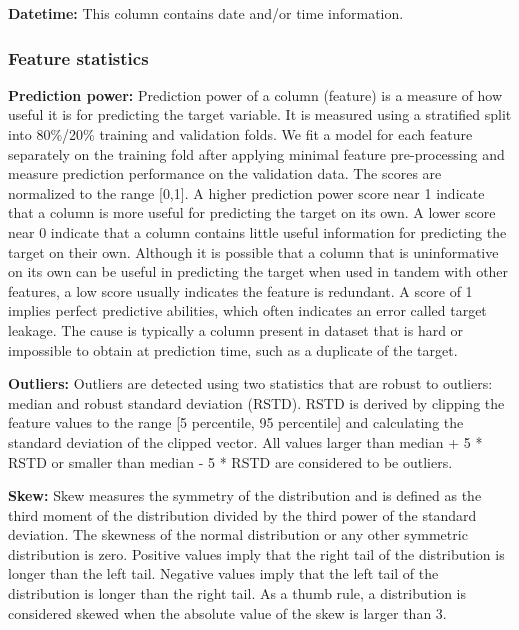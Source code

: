 \documentclass[11pt]{article}
\begin{document}
\textbf{Datetime:} This column contains date and/or time information.

\hypertarget{feature-statistics}{%
\subsubsection{Feature statistics}\label{feature-statistics}}

\textbf{Prediction power:} Prediction power of a column (feature) is a
measure of how useful it is for predicting the target variable. It is
measured using a stratified split into 80\%/20\% training and validation
folds. We fit a model for each feature separately on the training fold
after applying minimal feature pre-processing and measure prediction
performance on the validation data. The scores are normalized to the
range {[}0,1{]}. A higher prediction power score near 1 indicate that a
column is more useful for predicting the target on its own. A lower
score near 0 indicate that a column contains little useful information
for predicting the target on their own. Although it is possible that a
column that is uninformative on its own can be useful in predicting the
target when used in tandem with other features, a low score usually
indicates the feature is redundant. A score of 1 implies perfect
predictive abilities, which often indicates an error called target
leakage. The cause is typically a column present in dataset that is hard
or impossible to obtain at prediction time, such as a duplicate of the
target.

\textbf{Outliers:} Outliers are detected using two statistics that are
robust to outliers: median and robust standard deviation (RSTD). RSTD is
derived by clipping the feature values to the range {[}5 percentile, 95
percentile{]} and calculating the standard deviation of the clipped
vector. All values larger than median + 5 * RSTD or smaller than median
- 5 * RSTD are considered to be outliers.

\textbf{Skew:} Skew measures the symmetry of the distribution and is
defined as the third moment of the distribution divided by the third
power of the standard deviation. The skewness of the normal distribution
or any other symmetric distribution is zero. Positive values imply that
the right tail of the distribution is longer than the left tail.
Negative values imply that the left tail of the distribution is longer
than the right tail. As a thumb rule, a distribution is considered
skewed when the absolute value of the skew is larger than 3.
\end{document}
